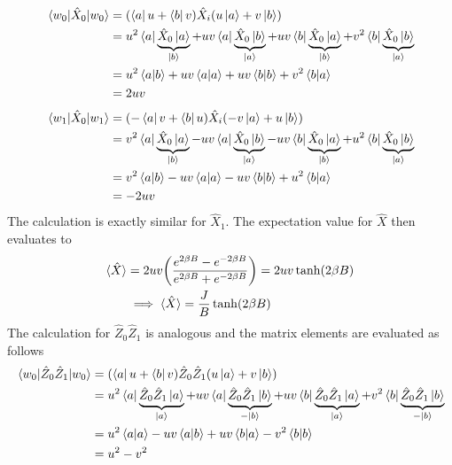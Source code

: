 \documentclass[../thesis_main.tex]{subfiles}
\begin{document}
\begingroup
\allowdisplaybreaks
\begin{align}
    \mel{w_0}{\hat{X}_0}{w_0} & = (\bra{a} u + \bra{b} v) \hat{X}_i (u \ket{a} + v \ket{b}) \nonumber\\
    & = u^2 \bra{a}\underbrace{{\hat{X}_0}\ket{a}}_{\ket{b}} +  uv \bra{a}\underbrace{{\hat{X}_0}\ket{b}}_{\ket{a}} + uv \bra{b}\underbrace{{\hat{X}_0}\ket{a}}_{\ket{b}} + v^2 \bra{b}\underbrace{{\hat{X}_0}\ket{b}}_{\ket{a}} \nonumber\\ 
    & = u^2 \braket{a}{b} + uv \braket{a}{a} + uv \braket{b}{b} + v^2\braket{b}{a} \nonumber\\
    & = 2uv
\end{align}
\endgroup
\begingroup
\allowdisplaybreaks
\begin{align}
    \mel{w_1}{\hat{X}_0}{w_1} & = (-\bra{a}v + \bra{b} u) \hat{X}_i (-v \ket{a} + u \ket{b}) \nonumber\\
    & = v^2 \bra{a}\underbrace{{\hat{X}_0}\ket{a}}_{\ket{b}} -  uv \bra{a}\underbrace{{\hat{X}_0}\ket{b}}_{\ket{a}} - uv \bra{b}\underbrace{{\hat{X}_0}\ket{a}}_{\ket{b}} + u^2 \bra{b}\underbrace{{\hat{X}_0}\ket{b}}_{\ket{a}} \nonumber\\ 
    & = v^2 \braket{a}{b} - uv \braket{a}{a} - uv \braket{b}{b} + u^2\braket{b}{a} \nonumber\\
    & = -2uv
\end{align}
\endgroup
The calculation is exactly similar for $\hat{X}_1$. The expectation value for $\hat{X}$  then evaluates to 
\begin{align}
    \langle \hat{X} \rangle & = 2uv \qty(\frac{e^{2\beta B} - e^{-2\beta B}}{e^{2\beta B} + e^{-2\beta B}}) = 2uv \tanh (2\beta B) \nonumber \\ 
    & \implies \langle{\hat{X}}\rangle = \frac{J}{B} \tanh(2\beta B)
    \label{X-hat_expval}
\end{align}
The calculation for $\hat{Z}_0 \hat{Z}_1$ is analogous and the matrix elements are evaluated as follows
\begin{align}
    \mel{w_0}{\hat{Z}_0 \hat{Z}_1}{w_0} & = (\bra{a} u + \bra{b} v) \hat{Z}_0 \hat{Z}_1 (u \ket{a} + v \ket{b}) \nonumber\\
    & = u^2 \bra{a}\underbrace{{\hat{Z}_0 \hat{Z}_1}\ket{a}}_{\ket{a}} +  uv \bra{a}\underbrace{{\hat{Z}_0 \hat{Z}_1}\ket{b}}_{-\ket{b}} + uv \bra{b}\underbrace{{\hat{Z}_0 \hat{Z}_1}\ket{a}}_{\ket{a}} + v^2 \bra{b}\underbrace{{\hat{Z}_0 \hat{Z}_1}\ket{b}}_{-\ket{b}} \nonumber\\ 
    & = u^2 \braket{a}{a} - uv \braket{a}{b} + uv \braket{b}{a} - v^2\braket{b}{b} \nonumber\\
    & = u^2 - v^2
\end{align}
\end{document}
